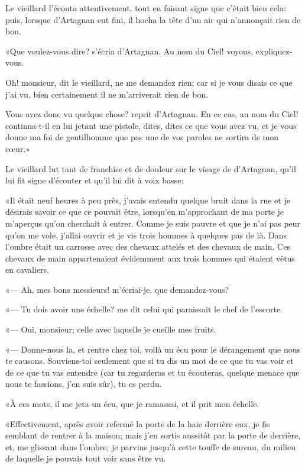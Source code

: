 Le vieillard l'écouta attentivement, tout en faisant signe que c'était bien cela: puis, lorsque d'Artagnan eut fini, il hocha la tête d'un air qui n'annonçait rien de bon. 

«Que voulez-vous dire? s'écria d'Artagnan. Au nom du Ciel! voyons, expliquez-vous. 

\speak  Oh! monsieur, dit le vieillard, ne me demandez rien; car si je vous disais ce que j'ai vu, bien certainement il ne m'arriverait rien de bon. 

\speak  Vous avez donc vu quelque chose? reprit d'Artagnan. En ce cas, au nom du Ciel! continua-t-il en lui jetant une pistole, dites, dites ce que vous avez vu, et je vous donne ma foi de gentilhomme que pas une de vos paroles ne sortira de mon cœur.» 

Le vieillard lut tant de franchise et de douleur sur le visage de d'Artagnan, qu'il lui fit signe d'écouter et qu'il lui dit à voix basse: 

«Il était neuf heures à peu près, j'avais entendu quelque bruit dans la rue et je désirais savoir ce que ce pouvait être, lorsqu'en m'approchant de ma porte je m'aperçus qu'on cherchait à entrer. Comme je suis pauvre et que je n'ai pas peur qu'on me vole, j'allai ouvrir et je vis trois hommes à quelques pas de là. Dans l'ombre était un carrosse avec des chevaux attelés et des chevaux de main. Ces chevaux de main appartenaient évidemment aux trois hommes qui étaient vêtus en cavaliers. 

«--- Ah, mes bons messieurs! m'écriai-je, que demandez-vous? 

«--- Tu dois avoir une échelle? me dit celui qui paraissait le chef de l'escorte. 

«--- Oui, monsieur; celle avec laquelle je cueille mes fruits. 

«--- Donne-nous la, et rentre chez toi, voilà un écu pour le dérangement que nous te causons. Souviens-toi seulement que si tu dis un mot de ce que tu vas voir et de ce que tu vas entendre (car tu regarderas et tu écouteras, quelque menace que nous te fassions, j'en suis sûr), tu es perdu. 

«À ces mots, il me jeta un écu, que je ramassai, et il prit mon échelle. 

«Effectivement, après avoir refermé la porte de la haie derrière eux, je fis semblant de rentrer à la maison; mais j'en sortis aussitôt par la porte de derrière, et, me glissant dans l'ombre, je parvins jusqu'à cette touffe de sureau, du milieu de laquelle je pouvais tout voir sans être vu. 

